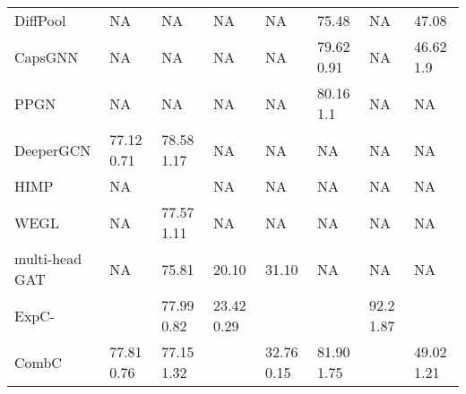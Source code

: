 \documentclass{article} \usepackage{iclr2021_conference,times}
\begin{document}
\begin{table}[h]
{\begin{tabular}{lllll|lll}
DiffPool \citep{ying2018hierarchical}      & NA                          & NA                         & NA                        & NA                         & 75.48               & NA    & 47.08 \\
CapsGNN      \citep{xinyi2018capsule}      & NA                          & NA                         & NA                        & NA                         & 79.62  0.91  & NA    & 46.62  1.9 \\
PPGN        \citep{maron2019provably}      & NA                          & NA                         & NA                        & NA                         & 80.16  1.1   & NA    & NA  \\
DeeperGCN     \citep{li2020deepergcn}      & 77.12  0.71         & 78.58  1.17        & NA                        & NA                         & NA                   & NA    & NA  \\
HIMP            \citep{Fey/etal/2020}      & NA                          &         & NA        & NA                         & NA                   & NA    & NA   \\
WEGL   \citep{kolouri2020wasserstein}      & NA                          & 77.57  1.11        & NA                        & NA                         & NA                   & NA    & NA  \\
multi-head GAT\citep{velivckovic2017graph} & NA                          & 75.81                     & 20.10                    & 31.10                     & NA                   & NA    & NA \\
\midrule
ExpC-                        &     & 77.99  0.82        & 23.42  0.29       &     &  & 92.2  1.87 & \\
CombC                                     & 77.81  0.76          & 77.15  1.32        &    & 32.76  0.15        & 81.90  1.75 &  & 49.02  1.21 \\
\bottomrule
\end{tabular}
}
\label{ogbg-baselines}
\end{table}
\end{document}
